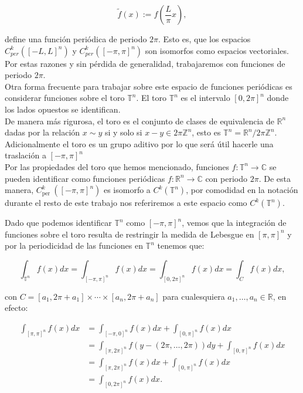 \documentclass[12pt]{article}
\newcommand\R{\ensuremath{\mathbb{R}}}
\newcommand\T{\mathbb{T}}
\begin{document}
$$
\widetilde{f}(x):=f\left(\frac{L}{\pi} x\right),
$$

define una función periódica de periodo $2 \pi$. Esto es, que los espacios $C_{p e r}^k([-L, L]^n)$ y $C_{p e r}^k([-\pi, \pi]^n)$ son isomorfos como espacios vectoriales. Por estas razones y sin pérdida de generalidad, trabajaremos con funciones de periodo $2\pi$.\\

Otra forma frecuente para trabajar sobre este espacio de funciones periódicas es considerar funciones sobre  el toro $\mathbb{T}^n$. El toro $\mathbb{T}^n$ es el intervalo $[0,2 \pi]^n$ donde los lados opuestos se identifican.\\

De manera más rigurosa, el toro es el conjunto de clases de equivalencia de $\mathbb{R}^n$ dadas por la relación $x \sim y$ si y solo si $x-y \in 2 \pi \mathbb{Z}^n$, esto es $\mathbb{T}^n=\mathbb{R}^n/ 2 \pi \mathbb{Z}^n$. Adicionalmente el toro es un grupo aditivo por lo que será útil hacerle una traslación a $[-\pi,\pi]^n$\\

Por las propiedades del toro que hemos mencionado, funciones $f: \mathbb{T}^n \rightarrow \mathbb{C}$ se pueden identificar como funciones periódicas $f: \mathbb{R}^n \rightarrow \mathbb{C}$ con periodo $2 \pi$. De esta manera, $C_{\text {per }}^k([-\pi, \pi]^n)$ es isomorfo a $C^k(\mathbb{T}^n)$, por comodidad en la notación durante el resto de  este trabajo nos referiremos a este espacio como $C^k(\T^n)$. \cite{ogrianoc}\\

\begin{note}
    Dado que  podemos identificar $\mathbb{T}^n$ como $[-\pi,\pi]^n$, vemos que la integración de funciones sobre el toro resulta de restringir la medida de Lebesgue en $[\pi,\pi]^n$ y por la periodicidad de las funciones en $\mathbb{T}^n$ tenemos que:

    $$\int_{\mathbb{T}^n} f(x) d x=\int_{[-\pi,\pi]^n} f(x) d x=\int_{[0,2\pi]^n} f(x) d x=\int_{C} f(x) d x,$$


    con $C=\left[a_1, 2\pi+a_1\right] \times \cdots \times\left[a_n, 2\pi+a_n\right]$ para cualesquiera $a_1,\ldots,a_n \in \R$, en efecto:

    $$\begin{aligned}
    \int_{[\pi, \pi]^n} f(x) d x & =\int_{[-\pi, 0]^n} f(x) d x+\int_{[0, \pi]^n} f(x) d x \\
     & =\int_{[\pi, 2 \pi]^n} f(y-(2 \pi,\ldots,2\pi)) d y+\int_{[0, \pi]^n} f(x) d x \\
    & =\int_{[\pi, 2 \pi]^n} f(x) d x+\int_{[0, \pi]^n} f(x) d x\\
    &=\int_{[0,2\pi]^n} f(x) d x.
    \end{aligned}$$
\end{note}
\end{document}
